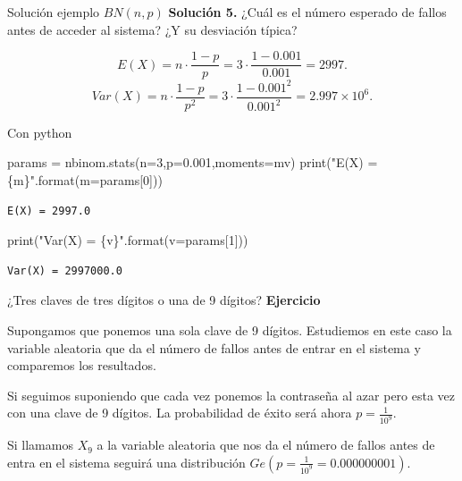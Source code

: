 \documentclass[
  ignorenonframetext,
  aspectratio=169]{beamer}
\newenvironment{Shaded}{\begin{snugshade}}{\end{snugshade}}
\newcommand{\BuiltInTok}[1]{\textcolor[rgb]{0.00,0.23,0.31}{#1}}
\newcommand{\DecValTok}[1]{\textcolor[rgb]{0.68,0.00,0.00}{#1}}
\newcommand{\FloatTok}[1]{\textcolor[rgb]{0.68,0.00,0.00}{#1}}
\newcommand{\NormalTok}[1]{\textcolor[rgb]{0.00,0.23,0.31}{#1}}
\newcommand{\OperatorTok}[1]{\textcolor[rgb]{0.37,0.37,0.37}{#1}}
\newcommand{\SpecialCharTok}[1]{\textcolor[rgb]{0.37,0.37,0.37}{#1}}
\newcommand{\StringTok}[1]{\textcolor[rgb]{0.13,0.47,0.30}{#1}}
\begin{document}
\begin{frame}[fragile]{Solución ejemplo \(BN(n,p)\)}
\protect\hypertarget{soluciuxf3n-ejemplo-bnnp-2}{}
\textbf{Solución 5.} ¿Cuál es el número esperado de fallos antes de
acceder al sistema? ¿Y su desviación típica?

\[E(X)=n\cdot \frac{1-p}{p}=3\cdot \frac{1- 0.001}{0.001}=2997.\]
\[Var(X)=n\cdot \frac{1-p}{p^2}=3\cdot \frac{1- 0.001^2}{0.001^2}=\ensuremath{2.997\times 10^{6}}.\]

Con python

\begin{Shaded}
\begin{Highlighting}[]
\NormalTok{params }\OperatorTok{=}\NormalTok{ nbinom.stats(n}\OperatorTok{=}\DecValTok{3}\NormalTok{,p}\OperatorTok{=}\FloatTok{0.001}\NormalTok{,moments}\OperatorTok{=}\StringTok{\textquotesingle{}mv\textquotesingle{}}\NormalTok{)}
\BuiltInTok{print}\NormalTok{(}\StringTok{"E(X) = }\SpecialCharTok{\{m\}}\StringTok{"}\NormalTok{.}\BuiltInTok{format}\NormalTok{(m}\OperatorTok{=}\NormalTok{params[}\DecValTok{0}\NormalTok{]))}
\end{Highlighting}
\end{Shaded}

\begin{verbatim}
E(X) = 2997.0
\end{verbatim}

\begin{Shaded}
\begin{Highlighting}[]
\BuiltInTok{print}\NormalTok{(}\StringTok{"Var(X) = }\SpecialCharTok{\{v\}}\StringTok{"}\NormalTok{.}\BuiltInTok{format}\NormalTok{(v}\OperatorTok{=}\NormalTok{params[}\DecValTok{1}\NormalTok{]))}
\end{Highlighting}
\end{Shaded}

\begin{verbatim}
Var(X) = 2997000.0
\end{verbatim}
\end{frame}

\begin{frame}{¿Tres claves de tres dígitos o una de 9 dígitos?}
\protect\hypertarget{tres-claves-de-tres-duxedgitos-o-una-de-9-duxedgitos}{}
\textbf{Ejercicio}

Supongamos que ponemos una sola clave de 9 dígitos. Estudiemos en este
caso la variable aleatoria que da el número de fallos antes de entrar en
el sistema y comparemos los resultados.

Si seguimos suponiendo que cada vez ponemos la contraseña al azar pero
esta vez con una clave de 9 dígitos. La probabilidad de éxito será ahora
\(p=\frac{1}{10^{9}}\).

Si llamamos \(X_9\) a la variable aleatoria que nos da el número de
fallos antes de entra en el sistema seguirá una distribución
\(Ge(p=\frac{1}{10^9}=0.000000001)\).
\end{frame}
\end{document}
